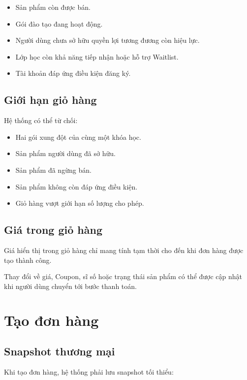 \documentclass[12pt,a4paper]{article}
\begin{document}
\begin{itemize}
    \item Sản phẩm còn được bán.
    \item Gói đào tạo đang hoạt động.
    \item Người dùng chưa sở hữu quyền lợi tương đương còn hiệu lực.
    \item Lớp học còn khả năng tiếp nhận hoặc hỗ trợ Waitlist.
    \item Tài khoản đáp ứng điều kiện đăng ký.
\end{itemize}

\subsection{Giới hạn giỏ hàng}

Hệ thống có thể từ chối:

\begin{itemize}
    \item Hai gói xung đột của cùng một khóa học.
    \item Sản phẩm người dùng đã sở hữu.
    \item Sản phẩm đã ngừng bán.
    \item Sản phẩm không còn đáp ứng điều kiện.
    \item Giỏ hàng vượt giới hạn số lượng cho phép.
\end{itemize}

\subsection{Giá trong giỏ hàng}

Giá hiển thị trong giỏ hàng chỉ mang tính tạm thời
cho đến khi đơn hàng được tạo thành công.

Thay đổi về giá, Coupon, sĩ số hoặc trạng thái sản phẩm
có thể được cập nhật khi người dùng chuyển tới bước thanh toán.

\section{Tạo đơn hàng}

\subsection{Snapshot thương mại}

Khi tạo đơn hàng, hệ thống phải lưu snapshot tối thiểu:
\end{document}
